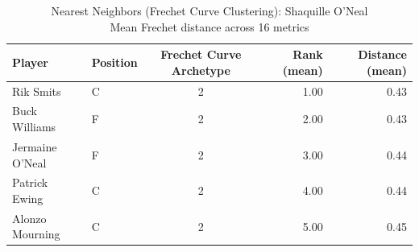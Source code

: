 \begin{table}[t]
\caption*{
{\fontsize{20}{25} Nearest Neighbors (Frechet Curve Clustering): Shaquille O'Neal\fontsize{12}{15}\selectfont } \\ 
{\fontsize{14}{17}\selectfont  Mean Frechet distance across 16 metrics\fontsize{12}{15}\selectfont }
} 
\fontsize{12.0pt}{14.0pt}\selectfont
\begin{tabular*}{\linewidth}{@{\extracolsep{\fill}}llcrr}
\toprule
Player & Position & Frechet Curve Archetype & Rank (mean) & Distance (mean) \\ 
\midrule\addlinespace[2.5pt]
Rik Smits & C & 2 & 1.00 & 0.43 \\ 
Buck Williams & F & 2 & 2.00 & 0.43 \\ 
Jermaine O'Neal & F & 2 & 3.00 & 0.44 \\ 
Patrick Ewing & C & 2 & 4.00 & 0.44 \\ 
Alonzo Mourning & C & 2 & 5.00 & 0.45 \\ 
\bottomrule
\end{tabular*}
\end{table}


